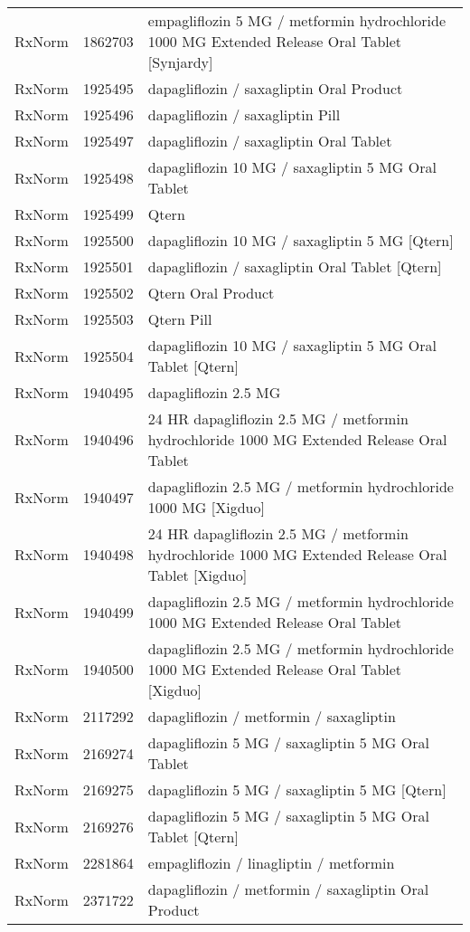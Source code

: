 \begin{longtable}{p{}p{}p{}}
  RxNorm & 1862703 & empagliflozin 5 MG / metformin hydrochloride 1000 MG Extended Release Oral Tablet [Synjardy] \\ 
  RxNorm & 1925495 & dapagliflozin / saxagliptin Oral Product \\ 
  RxNorm & 1925496 & dapagliflozin / saxagliptin Pill \\ 
  RxNorm & 1925497 & dapagliflozin / saxagliptin Oral Tablet \\ 
  RxNorm & 1925498 & dapagliflozin 10 MG / saxagliptin 5 MG Oral Tablet \\ 
  RxNorm & 1925499 & Qtern \\ 
  RxNorm & 1925500 & dapagliflozin 10 MG / saxagliptin 5 MG [Qtern] \\ 
  RxNorm & 1925501 & dapagliflozin / saxagliptin Oral Tablet [Qtern] \\ 
  RxNorm & 1925502 & Qtern Oral Product \\ 
  RxNorm & 1925503 & Qtern Pill \\ 
  RxNorm & 1925504 & dapagliflozin 10 MG / saxagliptin 5 MG Oral Tablet [Qtern] \\ 
  RxNorm & 1940495 & dapagliflozin 2.5 MG \\ 
  RxNorm & 1940496 & 24 HR dapagliflozin 2.5 MG / metformin hydrochloride 1000 MG Extended Release Oral Tablet \\ 
  RxNorm & 1940497 & dapagliflozin 2.5 MG / metformin hydrochloride 1000 MG [Xigduo] \\ 
  RxNorm & 1940498 & 24 HR dapagliflozin 2.5 MG / metformin hydrochloride 1000 MG Extended Release Oral Tablet [Xigduo] \\ 
  RxNorm & 1940499 & dapagliflozin 2.5 MG / metformin hydrochloride 1000 MG Extended Release Oral Tablet \\ 
  RxNorm & 1940500 & dapagliflozin 2.5 MG / metformin hydrochloride 1000 MG Extended Release Oral Tablet [Xigduo] \\ 
  RxNorm & 2117292 & dapagliflozin / metformin / saxagliptin \\ 
  RxNorm & 2169274 & dapagliflozin 5 MG / saxagliptin 5 MG Oral Tablet \\ 
  RxNorm & 2169275 & dapagliflozin 5 MG / saxagliptin 5 MG [Qtern] \\ 
  RxNorm & 2169276 & dapagliflozin 5 MG / saxagliptin 5 MG Oral Tablet [Qtern] \\ 
  RxNorm & 2281864 & empagliflozin / linagliptin / metformin \\ 
  RxNorm & 2371722 & dapagliflozin / metformin / saxagliptin Oral Product \\ 

\end{longtable}
